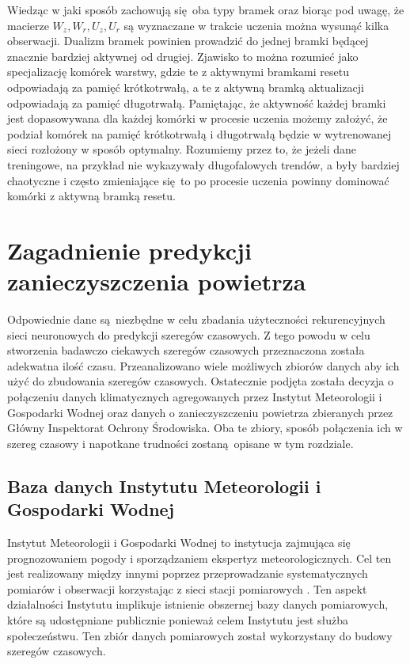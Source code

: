 \documentclass[10pt,a4paper]{article}
\begin{document}
Wiedząc w jaki sposób zachowują się oba typy bramek oraz biorąc pod uwagę, że macierze $W_z, W_r, U_z, U_r$ są wyznaczane w trakcie uczenia można wysunąć kilka obserwacji. Dualizm bramek powinien prowadzić do jednej bramki będącej znacznie bardziej aktywnej od drugiej. Zjawisko to można rozumieć jako specjalizację komórek warstwy, gdzie te z aktywnymi bramkami resetu odpowiadają za pamięć krótkotrwałą, a te z aktywną bramką aktualizacji odpowiadają za pamięć długotrwałą. Pamiętając, że aktywność każdej bramki jest dopasowywana dla każdej komórki w procesie uczenia możemy założyć, że podział komórek na pamięć krótkotrwałą i długotrwałą będzie w wytrenowanej sieci rozłożony w sposób optymalny. Rozumiemy przez to, że jeżeli dane treningowe, na przykład nie wykazywały długofalowych trendów, a były bardziej chaotyczne i często zmieniające się to po procesie uczenia powinny dominować komórki z aktywną bramką resetu.

\newpage
\section{Zagadnienie predykcji zanieczyszczenia powietrza}
Odpowiednie dane są niezbędne w celu zbadania użyteczności rekurencyjnych sieci neuronowych do predykcji szeregów czasowych. Z tego powodu w celu stworzenia badawczo ciekawych szeregów czasowych przeznaczona została adekwatna ilość czasu. Przeanalizowano wiele możliwych zbiorów danych aby ich użyć do zbudowania szeregów czasowych. Ostatecznie podjęta została decyzja o połączeniu danych klimatycznych agregowanych przez Instytut Meteorologii i Gospodarki Wodnej oraz danych o zanieczyszczeniu powietrza zbieranych przez Główny Inspektorat Ochrony Środowiska. Oba te zbiory, sposób połączenia ich w szereg czasowy i napotkane trudności zostaną opisane w tym rozdziale. 

\subsection{Baza danych Instytutu Meteorologii i Gospodarki Wodnej}
Instytut Meteorologii i Gospodarki Wodnej to instytucja zajmująca się prognozowaniem pogody i sporządzaniem ekspertyz meteorologicznych. Cel ten jest realizowany między innymi poprzez przeprowadzanie systematycznych pomiarów i obserwacji korzystając z sieci stacji pomiarowych \cite{imgwTask}. Ten aspekt działalności Instytutu implikuje istnienie obszernej bazy danych pomiarowych, które są udostępniane publicznie ponieważ celem Instytutu jest służba społeczeństwu. Ten zbiór danych pomiarowych został wykorzystany do budowy szeregów czasowych. 
\end{document}

